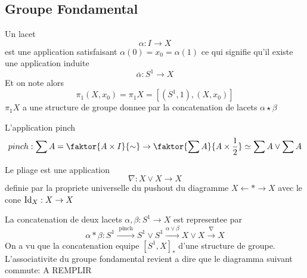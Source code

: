 \documentclass[../main.tex]{subfiles}
\begin{document}
\subsection{Groupe Fondamental}
Un lacet 
\[ 
\alpha: I \to X
\]
est une application satisfaisant $\alpha( 0) = x_0 = \alpha( 1) $ ce qui signifie qu'il existe une application induite
\[ 
\overline{\alpha}:S^{1}\to X
\]
Et on note alors
\[ 
\pi_1( X,x_0) = \pi_1X = [ ( S^{1},1) , ( X,x_0) ] 
\]
$\pi_1 X$ a une structure de groupe donnee par la concatenation de lacets $\alpha \star \beta$ 
\begin{defn}
	L'application pinch
	\[ 
	pinch: \sum A = \faktor { A\times I} { \sim} \to \faktor { \sum A} { A\times \frac{1}{2}} \simeq \sum A \vee \sum A
	\]
	
\end{defn}
\begin{defn}[Fold]
	Le pliage est une application
	\[ 
	\nabla: X\vee X \to X
	\]
	definie par la propriete universelle du pushout du diagramme $ X\leftarrow \ast \rightarrow X$ avec le cone $\operatorname{Id}_X:X\to X$ 
\end{defn}
La concatenation de deux lacets $\alpha,\beta: S^{1}\to X$ est representee par
\[ 
	\alpha \ast \beta: S^{1}\xrightarrow{ \text{ pinch } }  S^{1}\vee S^{1} \xrightarrow{\alpha\vee \beta} X\vee X \xrightarrow{\nabla} X
\]
On a vu que la concatenation equipe $ [ S^{1},X] _\ast$ d'une structure de groupe.\\
L'associativite du groupe fondamental revient a dire que le diagramma suivant commute:
A REMPLIR\\
\end{document}

